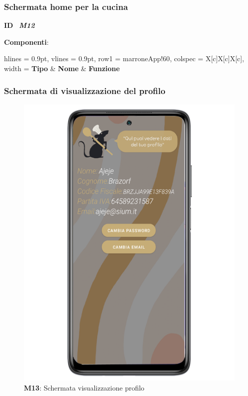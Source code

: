         \newpage

        \subsubsection{Schermata home per la cucina}
  
            \begin{flushleft}
              \textbf{ID}   \ \Large{\textit{\textbf{M12}}}
            \end{flushleft}
  
            \textbf{Componenti}:
            
            \begin{center}
              \begin{tblr}{hlines = {0.9pt}, vlines = {0.9pt}, row{1} = {marroneApp!60}, colspec = {X[c]X[c]X[c]}, width = \textwidth}
                \textbf{Tipo}   &   \textbf{Nome}   &   \textbf{Funzione} \\
  
              \end{tblr}
            \end{center}

            \newpage

            \subsubsection{Schermata di visualizzazione del profilo}
              \begin{figure}[H]
                \centering
                \includegraphics[scale=2.5]{assets/Mockup/Mockup_Profile.png}
                \caption*{\textbf{M13}: Schermata visualizzazione profilo}\label{fig:Mockup_Profile}
              \end{figure}
    
